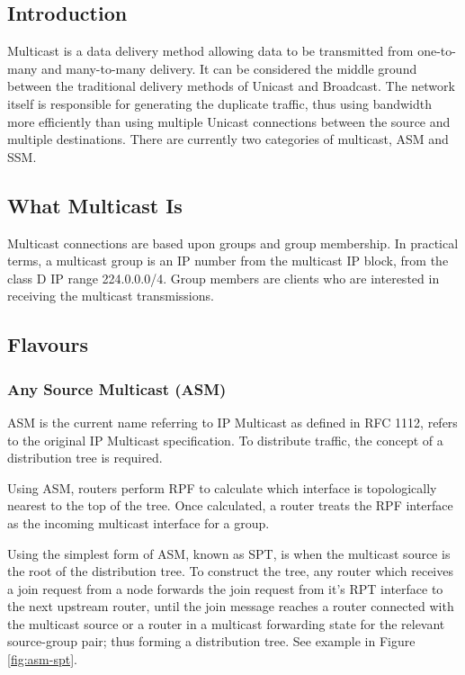 
\subsection{Introduction}

Multicast is a data delivery method allowing data to be transmitted from
one-to-many and many-to-many delivery. It can be considered the middle
ground between the traditional delivery methods of Unicast and
Broadcast. The network itself is responsible for generating the 
duplicate traffic, thus using bandwidth more efficiently than using 
multiple Unicast connections between the source and multiple 
destinations. There are currently two categories of multicast, ASM and 
SSM.

\subsection{What Multicast Is}

Multicast connections are based upon groups and group membership. In
practical terms, a multicast group is an IP number from the multicast IP
block, from the class D IP range 224.0.0.0/4. Group members are clients
who are interested in receiving the multicast transmissions.

\subsection{Flavours}

\subsubsection{Any Source Multicast (ASM)}
\label{sec:asm}

ASM is the current name referring to IP Multicast as defined in RFC
1112, refers to the original IP Multicast specification. To distribute
traffic, the concept of a distribution tree is required. 


Using ASM, routers perform RPF to calculate which interface is 
topologically nearest to the top of the tree. Once calculated, a router
treats the RPF interface as the incoming multicast interface for a
group.


Using the simplest form of ASM, known as SPT, is when the multicast
source is the root of the distribution tree. To construct the tree, any
router which receives a join request from a node forwards the join
request from it's RPT interface to the next upstream router, until the 
join message reaches a router connected with the multicast source or a
router in a multicast forwarding state for the relevant source-group
pair; thus forming a distribution tree. See example in Figure 
\ref{fig:asm-spt}.

